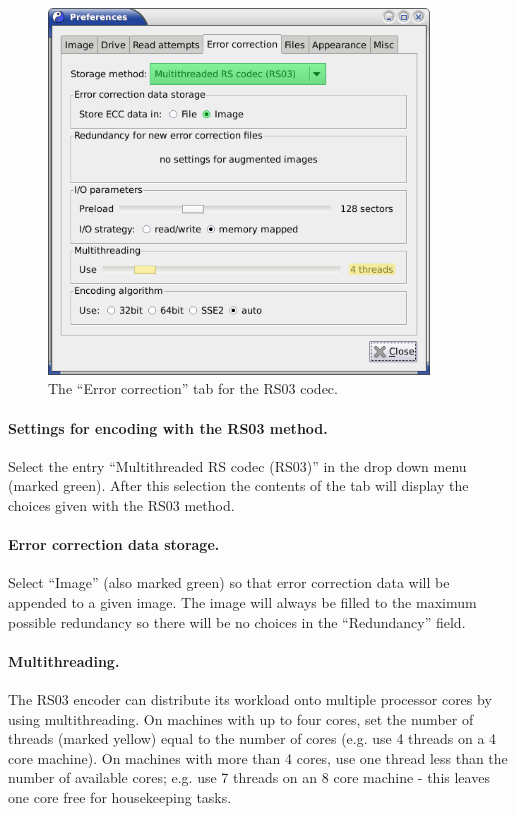 \newpage

\begin{figure}[h]
\centerline{\includegraphics[width=0.9\textwidth]{screenshots/augment-prefs-rs03.png}}
\caption{The ``Error correction'' tab for the RS03 codec.}  
\label{howto-augment-prefs-rs03}
\end{figure}

\paragraph{Settings for encoding with the RS03 method.}\quad

Select the entry ``Multithreaded RS codec (RS03)'' in the drop down menu (marked green).
After this selection the contents of the tab will display the choices given
with the RS03 method.

\paragraph{Error correction data storage.} Select ``Image'' (also marked green)
so that error correction data will be appended to a given image. The image will
always be filled to the maximum possible redundancy so there will be no choices
in the ``Redundancy'' field.

\paragraph{Multithreading.} The RS03 encoder can distribute its workload
onto multiple processor cores by using multithreading. On machines with
up to four cores, set the number of threads (marked yellow) equal to the
number of cores (e.g. use 4 threads on a 4 core machine). On machines with
more than 4 cores, use one thread less than the number of available cores;
e.g. use 7 threads on an 8 core machine - this leaves one core free for
housekeeping tasks.

